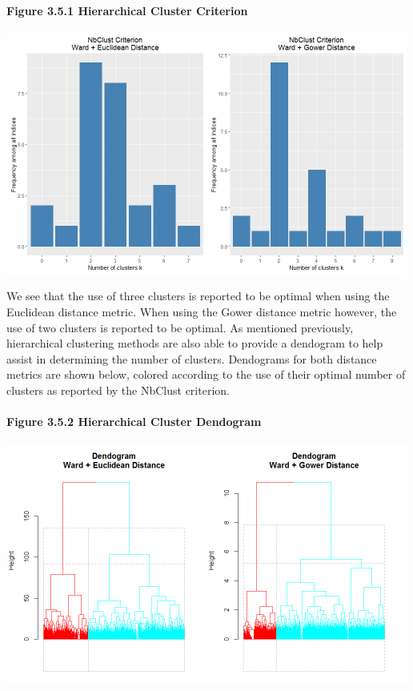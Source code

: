 \documentclass[]{article}
\let\oldparagraph\paragraph
\renewcommand{\paragraph}[1]{\oldparagraph{#1}\mbox{}}
\begin{document}
\paragraph{Figure 3.5.1 Hierarchical Cluster
Criterion}\label{figure-3.5.1-hierarchical-cluster-criterion}

\includegraphics[width=5.20833in]{images/hier_kcrit.png}

We see that the use of three clusters is reported to be optimal when
using the Euclidean distance metric. When using the Gower distance
metric however, the use of two clusters is reported to be optimal. As
mentioned previously, hierarchical clustering methods are also able to
provide a dendogram to help assist in determining the number of
clusters. Dendograms for both distance metrics are shown below, colored
according to the use of their optimal number of clusters as reported by
the NbClust criterion.

\paragraph{Figure 3.5.2 Hierarchical Cluster
Dendogram}\label{figure-3.5.2-hierarchical-cluster-dendogram}

\includegraphics[width=5.20833in]{images/hier_den.png}
\end{document}
